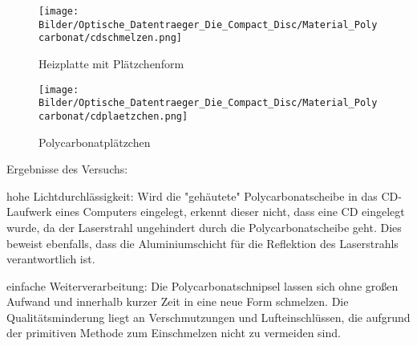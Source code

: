 \begin{figure}[h]
    \begin{center}
        \begin{minipage}[t]{0.4\textwidth}
            \begin{center}
                \texttt{[image: Bilder/Optische\_Datentraeger\_Die\_Compact\_Disc/Material\_Polycarbonat/cdschmelzen.png]}
                \caption[Heizplatte mit Plätzchenform]{Heizplatte mit Plätzchenform}
                \label{fig:cdschmelzen}
            \end{center}
        \end{minipage}
        \hspace{0.025\textwidth}
        \begin{minipage}[t]{0.4\textwidth}
            \begin{center}
                \texttt{[image: Bilder/Optische\_Datentraeger\_Die\_Compact\_Disc/Material\_Polycarbonat/cdplaetzchen.png]}
                \caption[\glqq Polycarbonatplätzchen\grqq{}]{\glqq Polycarbonatplätzchen\grqq{}}
                \label{fig:cdplaetzchen}
            \end{center}
        \end{minipage}
    \end{center}
\end{figure}

Ergebnisse des Versuchs:
\begin{enumerate*}
    \item hohe Lichtdurchlässigkeit: Wird die "gehäutete" Polycarbonatscheibe in das CD-Laufwerk eines Computers eingelegt, erkennt dieser nicht, dass eine CD eingelegt wurde, da der Laserstrahl ungehindert durch die Polycarbonatscheibe geht. Dies beweist ebenfalls, dass die Aluminiumschicht für die Reflektion des Laserstrahls verantwortlich ist.
    \item einfache Weiterverarbeitung: Die Polycarbonatschnipsel lassen sich ohne großen Aufwand und innerhalb kurzer Zeit in eine neue Form schmelzen. Die Qualitätsminderung liegt an Verschmutzungen und Lufteinschlüssen, die aufgrund der primitiven Methode zum Einschmelzen nicht zu vermeiden sind.
\end{enumerate*}
